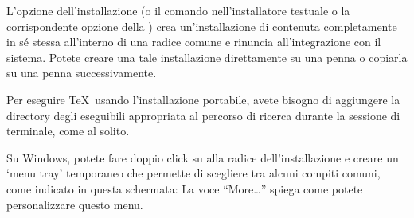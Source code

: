\documentclass{article}
\begin{document}
L'opzione  dell'installazione (o il comando 
nell'installatore testuale o la corrispondente opzione della \GUI) crea
un'installazione di \TL{} contenuta completamente in sé stessa all'interno
di una radice comune e rinuncia all'integrazione con il sistema. Potete
creare una tale installazione direttamente su una penna \USB{} o copiarla su
una penna \USB{} successivamente.

Per eseguire \TeX\ usando l'installazione portabile, avete bisogno di
aggiungere la directory degli eseguibili appropriata al percorso di ricerca
durante la sessione di terminale, come al solito.

Su Windows, potete fare doppio click su  alla radice
dell'installazione e creare un `menu tray' temporaneo che permette di
scegliere tra alcuni compiti comuni, come indicato in questa schermata:
\medskip
{}
\smallskip
\noindent La voce ``More\ldots'' spiega come potete personalizzare questo menu.
\end{document}
